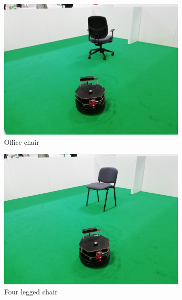 \begin{figure}[ht!]
  \centering
  \begin{subfigure}[b]{0.3\linewidth}
    \includegraphics[width=\linewidth]{imgs/chapter5/wchair.jpg}
     \caption{Office chair}
     \label{fig::wchair}
  \end{subfigure}
  \begin{subfigure}[b]{0.3\linewidth}
    \includegraphics[width=\linewidth]{imgs/chapter5/nchair.jpg}
    \caption{Four legged chair}
    \label{fig::nchair}
  \end{subfigure}
  \begin{subfigure}[b]{0.3\linewidth}

\end{subfigure}
\end{figure}
